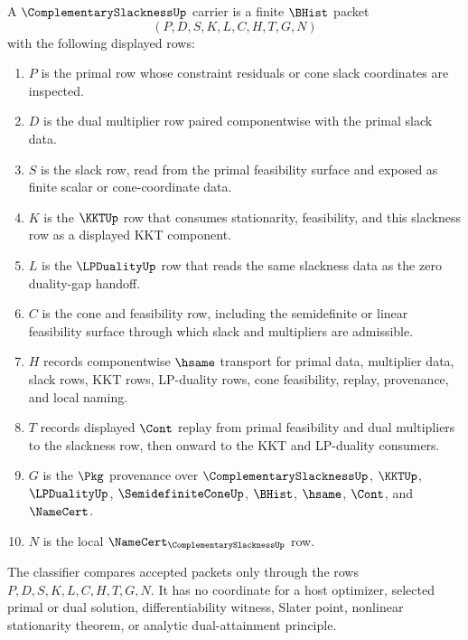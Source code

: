 \begin{definition}
\label{def:complementary-slackness-carrier}
A $\ComplementarySlacknessUp$ carrier is a finite $\BHist$ packet
$$
(P,D,S,K,L,C,H,T,G,N)
$$
with the following displayed rows:
\begin{enumerate}
\item $P$ is the primal row whose constraint residuals or cone slack coordinates are inspected.
\item $D$ is the dual multiplier row paired componentwise with the primal slack data.
\item $S$ is the slack row, read from the primal feasibility surface and exposed as finite scalar or cone-coordinate data.
\item $K$ is the $\KKTUp$ row that consumes stationarity, feasibility, and this slackness row as a displayed KKT component.
\item $L$ is the $\LPDualityUp$ row that reads the same slackness data as the zero duality-gap handoff.
\item $C$ is the cone and feasibility row, including the semidefinite or linear feasibility surface through which slack and multipliers are admissible.
\item $H$ records componentwise $\hsame$ transport for primal data, multiplier data, slack rows, KKT rows, LP-duality rows, cone feasibility, replay, provenance, and local naming.
\item $T$ records displayed $\Cont$ replay from primal feasibility and dual multipliers to the slackness row, then onward to the KKT and LP-duality consumers.
\item $G$ is the $\Pkg$ provenance over $\ComplementarySlacknessUp$, $\KKTUp$, $\LPDualityUp$, $\SemidefiniteConeUp$, $\BHist$, $\hsame$, $\Cont$, and $\NameCert$.
\item $N$ is the local $\NameCert_{\ComplementarySlacknessUp}$ row.
\end{enumerate}
The classifier compares accepted packets only through the rows $P,D,S,K,L,C,H,T,G,N$. It has no coordinate for a host optimizer, selected primal or dual solution, differentiability witness, Slater point, nonlinear stationarity theorem, or analytic dual-attainment principle.
\end{definition}

